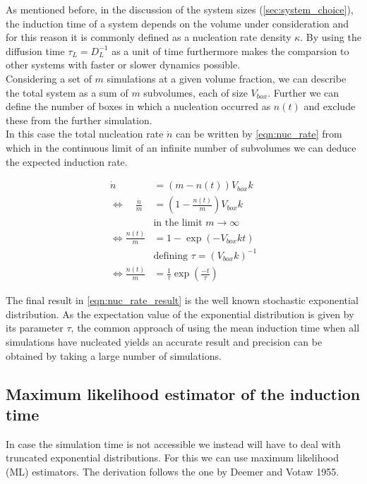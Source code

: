 As mentioned before, in the discussion of the system sizes (\autoref{sec:system_choice}), the induction time of a system depends on the volume under consideration and for this reason it is commonly defined as a nucleation rate density $\kappa$. By using the diffusion time $\tau_L = D_L^{-1}$ as a unit of time furthermore makes the comparsion to other systems with faster or slower dynamics possible.\\

Considering a set of $m$ simulations at a given volume fraction, we can describe the total system as a sum of $m$ subvolumes, each of size $V_{box}$.  Further we can define the number of boxes in which a nucleation occurred as $n(t)$ and exclude these from the further simulation.\\

In this case the total nucleation rate $ \dot{n} $ can be written by \autoref{eqn:nuc_rate} from which in the continuous limit of an infinite number of subvolumes we can deduce the expected induction rate.

\begin{align}
\label{eqn:nuc_rate}
\dot{n} &= (m - n(t))V_{box}k\\
\Leftrightarrow \quad \!\frac{\dot{n}}{m} &= \left(1 - \frac{n(t)}{m}\right) V_{box}k \nonumber\\
 &  \text{in the limit } m \rightarrow \infty \nonumber\\
\Leftrightarrow \frac{n(t)}{m} &= 1 - \exp\left( -V_{box} k t \right)\\
 &  \text{defining } \tau = (V_{box} k)^{-1} \nonumber\\
\label{eqn:nuc_rate_result}
\Leftrightarrow \frac{\dot{n}(t)}{m} &= \frac{1}{\tau} \exp\left( \frac{-t}{\tau} \right) 
\end{align}

The final result in \autoref{eqn:nuc_rate_result} is the well known stochastic exponential distribution. As the expectation value of the exponential distribution is given by its parameter $\tau$, the common approach of using the mean induction time when all simulations have nucleated yields an accurate result and precision can be obtained by taking a large number of simulations.

\subsection{Maximum likelihood estimator of the induction time}
\label{sec:ml_estimator}
In case the simulation time is not accessible we instead will have to deal with truncated exponential distributions. For this we can use maximum likelihood (ML) estimators. The derivation follows the one by Deemer and Votaw 1955\cite{Deemer1955}.\\

